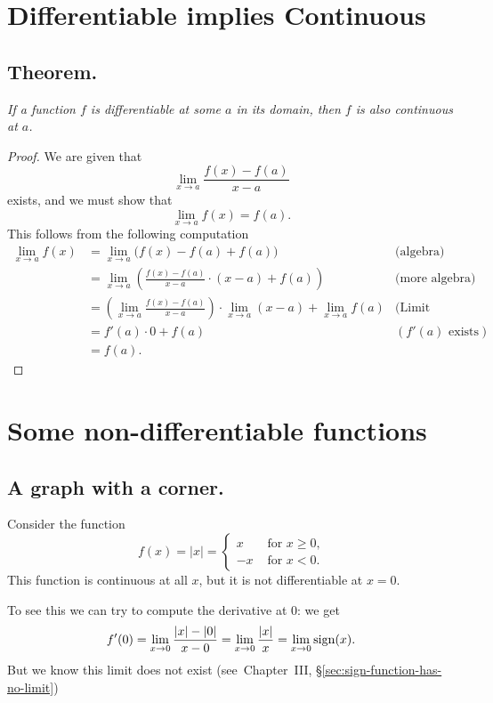 \section{Differentiable implies Continuous} 
\subsection{Theorem. } 
\label{sec:04differentiable-implies-continuous}\itshape
If a function $f$ is differentiable at some $a$ in its domain,
then $f $ is also continuous at $a$.
\upshape




\begin{proof}
  We are given that
  \[
  \lim_{x\to a}\frac{f(x)-f(a)}{x-a}
  \]
  exists, and we must show that
  \[
  \lim_{x\to a} f(x) = f(a).
  \]
  This follows from the following computation
  \begin{align*}
    \lim_{x\to a}f(x) &= \lim_{x\to a} \bigl(f(x)-f(a)+f(a) \bigr)
    &\text{(algebra)}\\
    &= \lim_{x\to a} \left(\frac{f(x)-f(a)}{x-a}\cdot(x-a) + f(a)\right)
    &\text{(more algebra)}\\
    &= \left( \lim_{x\to a} \frac{f(x)-f(a)}{x-a}\right) \cdot \lim_{x\to
    a}\left( x-a\right) + \lim_{x\to a} f(a)
    &\text{(Limit Properties)}\\[3pt]
    &= f'(a) \cdot 0 + f(a)
    &(f'(a) \text{ exists})\\[1ex]
    &= f(a).
  \end{align*}
\end{proof}




\section{Some non-differentiable functions} 
\subsection{A graph with a corner. } 
Consider the function
\[
f(x) = |x| =
\begin{cases}
  x&\text{ for $x\geq0$,}\\
  -x & \text{ for $x<0$.}
\end{cases}
\]
This function is continuous at all $x$, but it is not differentiable at $x=0$.




To see this we can try to compute the derivative at 0: we get
\[
f'(0) = \lim_{x\to 0} \frac{|x| - |0|}{x-0}
=\lim_{x\to 0} \frac{|x|}{x}
=\lim_{x\to 0} \mathop{\mathrm{sign}}(x).
\]
But we know this limit does not exist (see~Chapter~III, \S\ref{sec:sign-function-has-no-limit})




